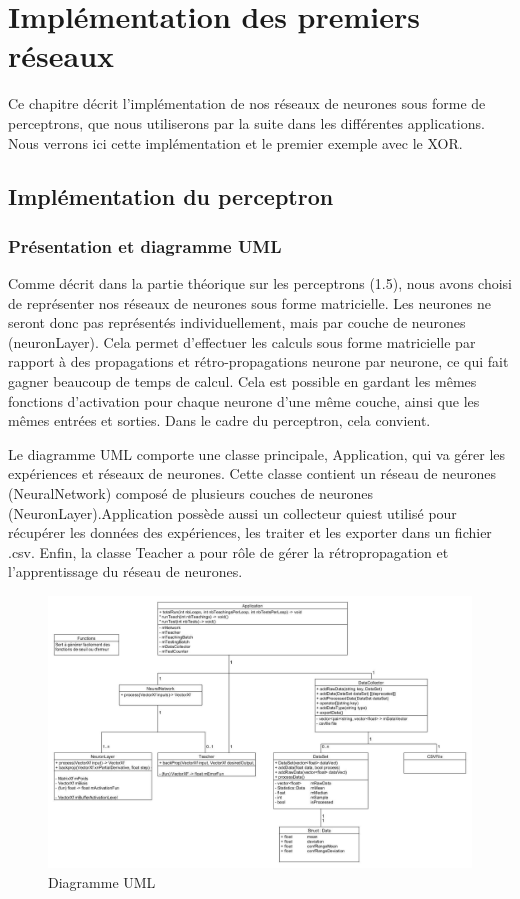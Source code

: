\chapter{Implémentation des premiers réseaux}

Ce chapitre décrit l'implémentation de nos réseaux de neurones sous forme de perceptrons, que nous utiliserons par la suite dans les différentes applications. Nous verrons ici cette implémentation et le premier exemple avec le XOR.

\section{Implémentation du perceptron}

\subsection{Présentation et diagramme UML}

Comme décrit dans la partie théorique sur les perceptrons (1.5), nous avons choisi de représenter nos réseaux de neurones sous forme matricielle. Les neurones ne seront donc pas représentés individuellement, mais par couche de neurones (neuronLayer). Cela permet d'effectuer les calculs sous forme matricielle par rapport à des propagations et rétro-propagations neurone par neurone, ce qui fait gagner beaucoup de temps de calcul.
Cela est possible en gardant les mêmes fonctions d'activation pour chaque neurone d'une même couche, ainsi que les mêmes entrées et sorties. Dans le cadre du perceptron, cela convient.

Le diagramme UML comporte une classe principale, Application, qui va gérer les expériences et réseaux de neurones. Cette classe contient un réseau de neurones (NeuralNetwork) composé de plusieurs couches de neurones (NeuronLayer).Application possède aussi un collecteur quiest utilisé pour récupérer les données des expériences, les traiter et les exporter dans un fichier .csv. Enfin, la classe Teacher a pour rôle de gérer la rétropropagation et l'apprentissage du réseau de neurones.

\newpage

\begin{figure}[h]
\begin{center}
\includegraphics[width=1\textwidth]{images/umlDiagram.jpg}\caption{Diagramme UML}
\end{center}
\end{figure} 

